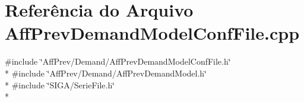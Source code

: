 \section{Referência do Arquivo Aff\+Prev\+Demand\+Model\+Conf\+File.\+cpp}
\label{_aff_prev_demand_model_conf_file_8cpp}
{\ttfamily \#include \char`\"{}Aff\+Prev/\+Demand/\+Aff\+Prev\+Demand\+Model\+Conf\+File.\+h\char`\"{}}\\*
{\ttfamily \#include \char`\"{}Aff\+Prev/\+Demand/\+Aff\+Prev\+Demand\+Model.\+h\char`\"{}}\\*
{\ttfamily \#include \char`\"{}S\+I\+G\+A/\+Serie\+File.\+h\char`\"{}}\\*
